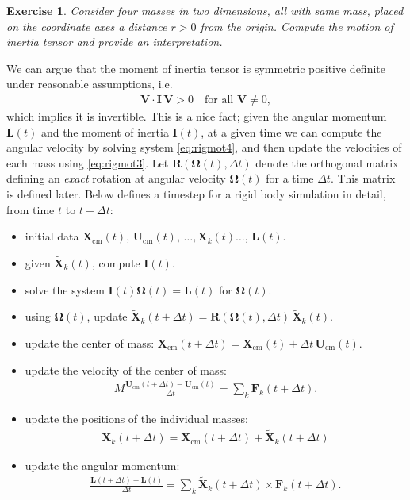 \documentclass[10pt]{article}
\newtheorem{myexer}{Exercise}
\newcommand{\bs}[1]{{\boldsymbol #1}}
\begin{document}
\begin{myexer}
Consider four masses in two dimensions, all with same mass, placed on the coordinate axes a distance $r > 0$ from the origin.  Compute the motion of inertia tensor and provide an interpretation.
\end{myexer}
We can argue that the moment of inertia tensor is symmetric positive definite under reasonable assumptions, i.e.
\begin{align*}
{\bs V} \cdot {\bs I}\, {\bs V} > 0 \quad \text{for all }{\bs V} \neq 0,
\end{align*}
which implies it is invertible.  This is a nice fact; given the angular momentum ${\bs L}(t)$ and the moment of inertia ${\bs I}(t)$, at a given time we can compute the angular velocity by solving system \eqref{eq:rigmot4}, and then update the velocities of each mass using \eqref{eq:rigmot3}.  Let ${\bs R}({\bs \Omega}(t),\Delta t)$ denote the orthogonal matrix defining an {\em exact} rotation at angular velocity ${\bs \Omega}(t)$ for a time $\Delta t$.  This matrix is defined later.  Below defines a timestep for a rigid body simulation in detail, from time $t$ to $t + \Delta t$:
\begin{itemize}
\item initial data ${\bs X}_\text{cm}(t)$, ${\bs U}_\text{cm}(t)$, $\ldots, {\bs X}_k(t) \ldots$, ${\bs L}(t)$.
\item given $\tilde{{\bs X}}_k(t)$, compute ${\bs I}(t)$.
\item solve the system ${\bs I}(t){\bs \Omega}(t) = {\bs L}(t)$ for ${\bs \Omega}(t)$.
\item using ${\bs \Omega}(t)$, update $\tilde{{\bs X}}_k(t + \Delta t) = {\bs R}({\bs \Omega}(t), \Delta t)\, \tilde{{\bs X}}_k(t)$.
\item update the center of mass: ${\bs X}_\text{cm}(t + \Delta t) = {\bs X}_\text{cm}(t) + \Delta t \, {\bs U}_\text{cm}(t)$.
\item update the velocity of the center of mass:
\begin{align*}
M \frac{{\bs U}_\text{cm}(t + \Delta t) - {\bs U}_\text{cm}(t)}{\Delta t} = \sum_k {\bs F}_k(t + \Delta t).
\end{align*}
\item update the positions of the individual masses:
\begin{align*}
{\bs X}_k(t+\Delta t) = {\bs X}_\text{cm}(t + \Delta t) + \tilde{{\bs X}}_k(t+\Delta t)
\end{align*}
\item update the angular momentum:
\begin{align*}
\frac{{\bs L}(t + \Delta t) - {\bs L}(t)}{\Delta t} = \sum_k \tilde{{\bs X}}_k(t + \Delta t) \times {\bs F}_k(t + \Delta t).
\end{align*}
\end{itemize}
\end{document}
